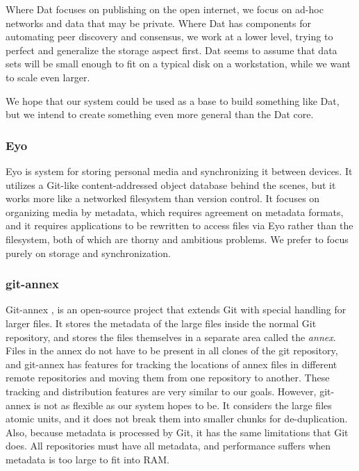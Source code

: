 \documentclass[a4paper]{article}
\newcommand{\newterm}{\textit}
\begin{document}
Where Dat focuses on publishing on the open internet, we focus on ad-hoc
networks and data that may be private. Where Dat has components for automating
peer discovery and consensus, we work at a lower level, trying to perfect and
generalize the storage aspect first. Dat seems to assume that data sets will be
small enough to fit on a typical disk on a workstation, while we want to scale
even larger.

We hope that our system could be used as a base to build something like Dat, but
we intend to create something even more general than the Dat core.


\subsubsection{Eyo}

Eyo \cite{Strauss:2011:EDP:2002181.2002216} is system for storing personal media
and synchronizing it between devices. It utilizes a Git-like content-addressed
object database behind the scenes, but it works more like a networked filesystem
than version control. It focuses on organizing media by metadata, which requires
agreement on metadata formats, and it requires applications to be rewritten to
access files via Eyo rather than the filesystem, both of which are thorny and
ambitious problems. We prefer to focus purely on storage and synchronization.


\subsubsection{git-annex}

Git-annex \cite{git_annex_homepage}, is an open-source project that extends Git
with special handling for larger files. It stores the metadata of the large
files inside the normal Git repository, and stores the files themselves in a
separate area called the \newterm{annex}. Files in the annex do not have to be
present in all clones of the git repository, and git-annex has features for
tracking the locations of annex files in different remote repositories and
moving them from one repository to another. These tracking and distribution
features are very similar to our goals. However, git-annex is not as flexible as
our system hopes to be. It considers the large files atomic units, and it does
not break them into smaller chunks for de-duplication. Also, because metadata is
processed by Git, it has the same limitations that Git does. All repositories
must have all metadata, and performance suffers when metadata is too large to
fit into RAM.
\end{document}
